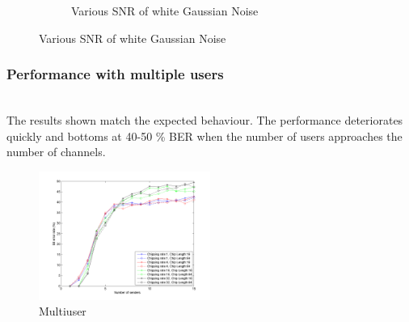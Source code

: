\begin{figure}[H]
\begin{subfigure}[b]{0.5\textwidth}
					\caption{Various SNR of white Gaussian Noise}
					\label{fig:fhss_gaussian}
				\end{subfigure}
			\end{figure}
		
		\subsubsection{Performance with multiple users}~\\
			The results shown match the expected behaviour. The performance deteriorates quickly and bottoms at 40-50 \% BER when the number of users approaches the number of channels.
			\begin{figure}[H]
				\includegraphics[width=0.5\textwidth]{imgs/results/plot_mode_fhss-test_numSenders-rep_20-dataRate_8-dataLength_128.png}
				\caption{Multiuser}
				\label{fig:fhss_multiuser}
			\end{figure}